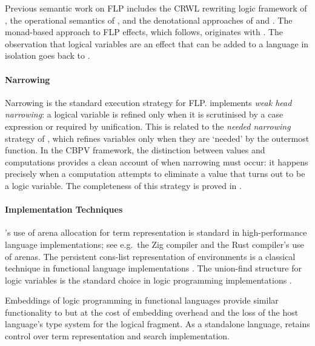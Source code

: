 Previous semantic work on FLP includes the CRWL rewriting logic framework of
\textcite{gonzalez-moreno_1999}, the operational semantics of
\textcite{albert_2005}, and the denotational approaches of
\textcite{christiansen_2011} and \textcite{mehner_2014}. The monad-based
approach to FLP effects, which \Gweek{} follows, originates with
\textcite{staton_2013}. The observation that logical variables are an effect that
can be added to a language in isolation goes back to \textcite{lindstrom_1985}.

\paragraph{Narrowing}

Narrowing \parencite{reddy_1985} is the standard execution strategy for FLP.
\Gweek{} implements \emph{weak head narrowing}: a logical variable is refined
only when it is scrutinised by a case expression or required by unification.
This is related to the \emph{needed narrowing} strategy of
\textcite{antoy_1997}, which refines variables only when they are `needed' by
the outermost function. In the CBPV framework, the distinction between values
and computations provides a clean account of when narrowing must occur: it
happens precisely when a computation attempts to eliminate a value that turns out
to be a logic variable. The completeness of this strategy is proved in
\parencite{jones_2026}.

\paragraph{Implementation Techniques}

\Gweek{}'s use of arena allocation for term representation is standard in
high-performance language implementations; see e.g.\ the Zig compiler and the
Rust compiler's use of arenas. The persistent cons-list representation of
environments is a classical technique in functional language implementations
\parencite{landin_1964,henderson_1980}. The union-find structure for logic
variables is the standard choice in logic programming implementations
\parencite{warren_1983}.

Embeddings of logic programming in functional languages
\parencite{claessen_2001,seres_1999,hinze_1998} provide similar functionality
to \Gweek{} but at the cost of embedding overhead and the loss of the host
language's type system for the logical fragment. As a standalone language,
\Gweek{} retains control over term representation and search implementation.
